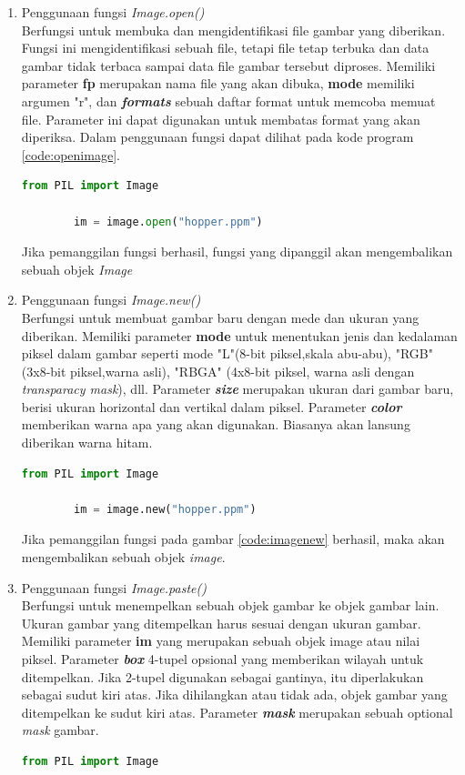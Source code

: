 \begin{enumerate}
	\item Penggunaan fungsi \textit{Image.open()}\\
	Berfungsi untuk membuka dan mengidentifikasi file gambar yang diberikan. Fungsi ini mengidentifikasi sebuah file, tetapi file tetap terbuka dan data gambar tidak terbaca sampai data file gambar tersebut diproses. Memiliki parameter \textbf{fp} merupakan nama file yang akan dibuka, \textbf{mode} memiliki argumen "r", dan \textit{\textbf{formats}} sebuah daftar format untuk memcoba memuat file. Parameter ini dapat digunakan untuk membatas format yang akan diperiksa. Dalam penggunaan fungsi dapat dilihat pada kode program \ref{code:openimage}.
	\begin{lstlisting}[language=Python, caption=Pemanggilan fungsi \textit{open()},label={code:openimage}]
		from PIL import Image
		
		im = image.open("hopper.ppm")
	\end{lstlisting}
	Jika pemanggilan fungsi berhasil, fungsi yang dipanggil akan mengembalikan sebuah objek \textit{Image}
	\item Penggunaan fungsi \textit{Image.new()}\\
	Berfungsi untuk membuat gambar baru dengan mede dan ukuran yang diberikan. Memiliki parameter \textbf{mode} untuk menentukan jenis dan kedalaman piksel dalam gambar seperti mode "L"(8-bit piksel,skala abu-abu), "RGB" (3x8-bit piksel,warna asli), "RBGA" (4x8-bit piksel, warna asli dengan \textit{transparacy mask}), dll. Parameter \textit{\textbf{size}} merupakan ukuran dari gambar baru, berisi ukuran horizontal dan vertikal dalam piksel. Parameter \textit{\textbf{color}} memberikan warna apa yang akan digunakan. Biasanya akan lansung diberikan warna hitam.
	\begin{lstlisting}[language=Python, caption=Pemanggilan fungsi \textit{new()},label={code:imagenew}]
		from PIL import Image
		
		im = image.new("hopper.ppm")
	\end{lstlisting}
	Jika pemanggilan fungsi pada gambar \ref{code:imagenew} berhasil, maka akan mengembalikan sebuah objek \textit{image}.
	\item Penggunaan fungsi \textit{Image.paste()}\\
	Berfungsi untuk menempelkan sebuah objek gambar ke objek gambar lain. Ukuran gambar yang ditempelkan harus sesuai dengan ukuran gambar. Memiliki parameter \textbf{im} yang merupakan sebuah objek image atau nilai piksel. Parameter \textit{\textbf{box}} 4-tupel opsional yang memberikan wilayah untuk ditempelkan. Jika 2-tupel digunakan sebagai gantinya, itu diperlakukan sebagai sudut kiri atas. Jika dihilangkan atau tidak ada, objek gambar yang ditempelkan ke sudut kiri atas. Parameter \textit{\textbf{mask}} merupakan sebuah optional \textit{mask} gambar.
	\begin{lstlisting}[language=Python, caption=Pemanggilan fungsi \textit{paste()},label={code:imagepaste}]
		from PIL import Image
		

\end{lstlisting}
\end{enumerate}
